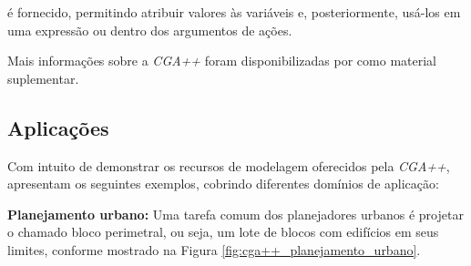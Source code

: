 \vspace{0.5cm}

\noindent é fornecido, permitindo atribuir valores às variáveis e, posteriormente, usá-los em uma expressão ou dentro dos argumentos de ações.

Mais informações sobre a \textit{CGA++} foram disponibilizadas por  como material suplementar.

\subsection{Aplicações}
\label{sec:aplicacoes_cga++}

Com intuito de demonstrar os recursos de modelagem oferecidos pela \textit{CGA++},  apresentam os seguintes exemplos, cobrindo diferentes domínios de aplicação:

\textbf{Planejamento urbano:} Uma tarefa comum dos planejadores urbanos é projetar o chamado bloco perimetral, ou seja, um lote de blocos com edifícios em seus limites, conforme mostrado na Figura \ref{fig:cga++_planejamento_urbano}.

\begin{figure}[h!]
	\centering
	\captionsetup{width=15cm}
	{}
\end{figure}

